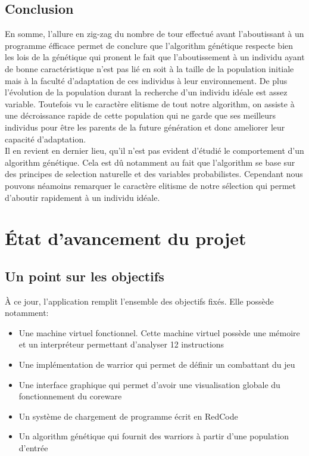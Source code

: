 \documentclass[12pt]{article}
\begin{document}
\subsection*{Conclusion}
En somme, l'allure en zig-zag du nombre de tour effectué avant l'aboutissant à un programme éfficace
permet de conclure que l'algorithm génétique respecte bien les lois de la génétique qui pronent le fait que 
l'aboutissement à un individu ayant de bonne caractéristique n'est pas lié en soit à la taille de la population initiale
mais à la faculté d'adaptation de ces individus à leur environnement. De plus l'évolution de la population durant la 
recherche d'un individu idéale est assez variable. Toutefois vu le caractère elitisme de tout notre algorithm,
on assiste à une décroissance rapide de cette population qui ne garde que ses meilleurs individus pour être les parents 
de la future génération et donc ameliorer leur capacité d'adaptation.\\

Il en revient en dernier lieu, qu'il n'est pas evident d'étudié le comportement d'un algorithm génétique. Cela
est dû notamment au fait que l'algorithm se base sur des principes de selection naturelle et des variables probabilistes.
Cependant nous pouvons néamoins remarquer le caractère elitisme de notre sélection qui permet d'aboutir rapidement
à un individu idéale.
\section{État d'avancement du projet}
\subsection{Un point sur les objectifs}
À ce jour, l'application remplit l'ensemble des objectifs fixés. Elle possède notamment:
\begin{itemize}
	\item Une machine virtuel fonctionnel. Cette machine virtuel possède une mémoire et un interpréteur permettant d'analyser 12 instructions
	\item Une implémentation de warrior qui permet de définir un combattant du jeu
	\item Une interface graphique qui permet d'avoir une visualisation globale du fonctionnement du coreware
	\item Un système de chargement de programme écrit en RedCode
	\item Un algorithm génétique qui fournit des warriors à partir d'une population d'entrée
\end{itemize}
\end{document}
